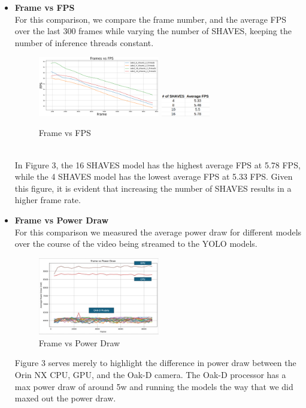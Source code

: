 \documentclass[sigconf,authorversion,nonacm]{acmart}
\begin{document}
\begin{itemize}
    \item \textbf{Frame vs FPS} \\ For this comparison, we compare the frame number, and the average FPS over the last 300 frames while varying the number of SHAVES, keeping the number of inference threads constant.
    \begin{figure}[h] %
        \centering
        \includegraphics[width=0.5\textwidth]{figures/shavesvfps.png}
        \includegraphics[width=0.2\textwidth]{figures/shavesvfpstable.png}
        \caption{Frame vs FPS}
        \label{fig:your_label}
    \end{figure}
    \\ In Figure 3, the 16 SHAVES model has the highest average FPS at 5.78 FPS, while the 4 SHAVES model has the lowest average FPS at 5.33 FPS. Given this figure, it is evident that increasing the number of SHAVES results in a higher frame rate.

    \clearpage
    \item \textbf{Frame vs Power Draw} \\For this comparison we measured the average power draw for different models over the course of the video being streamed to the YOLO models.
    \begin{figure}[h] %
        \centering
        \includegraphics[width=0.5\textwidth]{figures/fram-vs-powerdraw-scatter.png}
        \caption{Frame vs Power Draw}
        \label{fig:your_label}
    \end{figure}
    
    Figure 3 serves merely to highlight the difference in power draw between the Orin NX CPU, GPU, and the Oak-D camera. The Oak-D processor has a max power draw of around 5w and running the models the way that we did maxed out the power draw.


\end{itemize}
\end{document}
